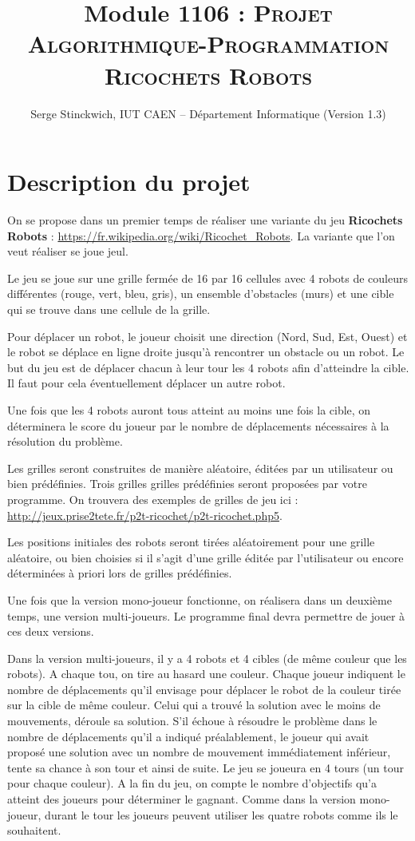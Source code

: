 \documentclass[10pt]{article}
\title{Module 1106 : \textsc{Projet Algorithmique-Programmation \\ Ricochets Robots}}
\author{Serge Stinckwich, IUT CAEN -- Département Informatique (Version 1.3)}
\begin{document}
\maketitle

\pagestyle{empty}

\section{Description du projet}

On se propose dans un premier temps de réaliser une variante du jeu {\bf Ricochets Robots} : \url{https://fr.wikipedia.org/wiki/Ricochet_Robots}. La variante que l'on veut réaliser se joue jeul.

Le jeu se joue sur une grille fermée de 16 par 16 cellules avec 4 robots de couleurs différentes (rouge, vert,
bleu, gris), un ensemble d'obstacles (murs) et une cible qui se trouve dans une cellule de la grille.

Pour déplacer un robot, le joueur choisit une direction (Nord, Sud, Est, Ouest) et le robot se déplace en ligne droite jusqu'à rencontrer un obstacle ou un robot. Le but du jeu est de déplacer chacun à leur tour les 4 robots afin d'atteindre la cible. Il faut pour cela éventuellement déplacer un autre robot.

Une fois que les 4 robots auront tous atteint au moins une fois la cible, on déterminera le score du joueur par le nombre de déplacements nécessaires à la résolution du problème.

Les grilles seront construites de manière aléatoire, éditées par un utilisateur ou bien prédéfinies. 
Trois grilles grilles prédéfinies seront proposées par votre programme. On trouvera des exemples de grilles de jeu ici :
\url{http://jeux.prise2tete.fr/p2t-ricochet/p2t-ricochet.php5}.

Les positions initiales des robots seront tirées aléatoirement pour une grille aléatoire, ou bien choisies si il s'agit d'une grille éditée par l'utilisateur ou encore déterminées à priori lors de grilles prédéfinies.

Une fois que la version mono-joueur fonctionne, on réalisera dans un deuxième temps, une version multi-joueurs. Le programme final devra permettre de jouer à ces deux versions.

Dans la version multi-joueurs, il y a 4 robots et 4 cibles (de même couleur que les robots). A chaque tou, on tire au hasard une couleur. Chaque joueur indiquent le nombre de déplacements qu'il envisage pour déplacer le robot de la couleur tirée sur la cible de même couleur. Celui qui a trouvé la solution avec le moins de mouvements, déroule sa solution. S'il échoue à résoudre le problème dans le nombre de déplacements qu'il a indiqué préalablement, le joueur qui avait proposé une solution avec un nombre de mouvement immédiatement inférieur, tente sa chance à son tour et ainsi de suite. Le jeu se joueura en 4 tours (un tour pour chaque couleur). A la fin du jeu, on compte le nombre d'objectifs qu'a atteint des joueurs pour déterminer le gagnant. Comme dans la version mono-joueur, durant le tour les joueurs peuvent utiliser les quatre robots comme ils le souhaitent.
\end{document}
